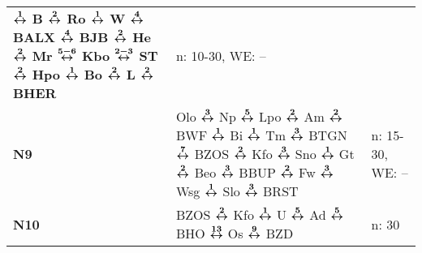 \begin{minipage}[t]{0.45\textwidth}
\begin{tabular}{>{\bfseries}L{1.2cm}L{9.0cm}L{3.0cm}}
                $\xarwe{1}$ B $\xarwe{2}$ Ro $\xarwe{1}$ W $\xarwe{4}$ BALX $\xarwe{4}$ BJB $\xarwe{2}$ He $\xarwe{2}$ Mr $\xarwe{5-6}$ Kbo $\xarwe{2-3}$ ST $\xarwe{2}$ Hpo        %
                $\xarwe{1}$ Bo $\xarwe{2}$ L $\xarwe{2}$ BHER                                                                                                                       & n: 10-30, WE: --           \\
\nbus{} N9    & Olo $\xarwe{3}$ Np $\xarwe{5}$ Lpo $\xarwe{2}$ Am $\xarwe{2}$ BWF $\xarwe{1}$ Bi $\xarwe{1}$ Tm $\xarwe{3}$ BTGN $\xarwe{7}$ BZOS $\xarwe{2}$ Kfo $\xarwe{3}$ Sno   %
                $\xarwe{1}$ Gt $\xarwe{2}$ Beo $\xarwe{3}$ BBUP $\xarwe{2}$ Fw $\xarwe{3}$ Wsg $\xarwe{1}$ Slo $\xarwe{3}$ BRST                                                     & n: 15-30, WE: --           \\ 
\nbus{} N10   & BZOS $\xarwe{2}$ Kfo $\xarwe{1}$ U $\xarwe{5}$ Ad $\xarwe{5}$ BHO $\xarwe{13}$ Os $\xarwe{9}$ BZD                                                                   & n: 30                      \\
\hline
\end{tabular}
\end{minipage}
